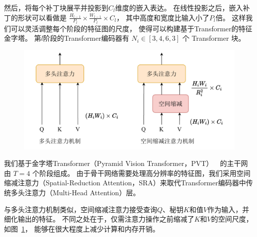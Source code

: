 然后，将每个补丁块展平并投影到$C_{l}$维度的嵌入表达。
在线性投影之后，嵌入补丁的形状可以看做是
$\frac{H_{l-1}}{P_{l}} \times \frac{W_{l-1}}{P_{l}} \times C_{l} $，
其中高度和宽度比输入小了$P_{l}$倍。
这样我们可以灵活调整每个阶段的特征图的尺度，
使得可以构建基于Transformer的特征金字塔。
%
%
%
%
第$l$阶段的Transformer编码器有 $ N_{i} \in [3,4,6,3] $ 个 Transformer 块。
%
%
%
%
%
\begin{figure}[!ht]
	\centering
	\includegraphics[width=0.95\linewidth]{figures/chapter3/sra}
	\label{cpt3_fig1:sra}
\end{figure}
%
%
%
%
%
%
%
我们基于金字塔Transformer（Pyramid Vision Transformer，PVT）~\cite{wang2022pvt}~的主干网由 $T = 4$ 个阶段组成。 
%
%
由于骨干网络需要处理高分辨率的特征图，我们采用空间缩减注意力（Spatial-Reduction Attention，SRA）来取代Transformer编码器中传统多头注意力（Multi-Head Attention）层。
%
%
%
\par 
%
%
与多头注意力机制类似，空间缩减注意力接受查询$Q$、秘钥$K$和值$V$作为输入，并细化输出的特征。
不同之处在于，仅需注意力操作之前缩减了$K$和$V$的空间尺度，如图~\ref{cpt3_fig1:sra}，
能够在很大程度上减少计算和内存开销。
